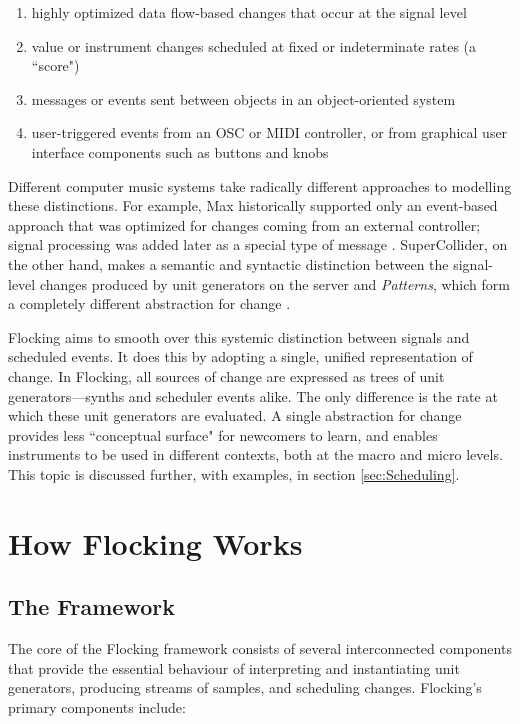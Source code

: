 \documentclass{article}
\begin{document}
\begin{enumerate}
\item highly optimized data flow-based changes that occur at the signal level
\item value or instrument changes scheduled at fixed or indeterminate rates (a ``score")
\item messages or events sent between objects in an object-oriented system
\item user-triggered events from an OSC or MIDI controller, or from graphical user interface components such as buttons and knobs
\end{enumerate}

Different computer music systems take radically different approaches to modelling these distinctions. For example, Max historically supported only an event-based approach that was optimized for changes coming from an external controller; signal processing was added later as a special type of message \cite{puckette2002max}.
SuperCollider, on the other hand, makes a semantic and syntactic distinction between the signal-level changes produced by unit generators on the server \cite{mccartney1996supercollider} and {\it Patterns}, which form a completely different abstraction for change \cite[pp. 189]{wilson2011supercollider}.

Flocking aims to smooth over this systemic distinction between signals and scheduled events. It does this by adopting a single, unified representation of change. In Flocking, all sources of change are expressed as trees of unit generators---synths and scheduler events alike. The only difference is the rate at which these unit generators are evaluated. A single abstraction for change provides less ``conceptual surface" for newcomers to learn, and enables instruments to be used in different contexts, both at the macro and micro levels. This topic is discussed further, with examples, in section \ref{sec:Scheduling}.

\section{How Flocking Works}

\subsection{The Framework}

The core of the Flocking framework consists of several interconnected components that provide the essential behaviour of interpreting and instantiating unit generators, producing streams of samples, and scheduling changes. Flocking's primary components include:
\end{document}
